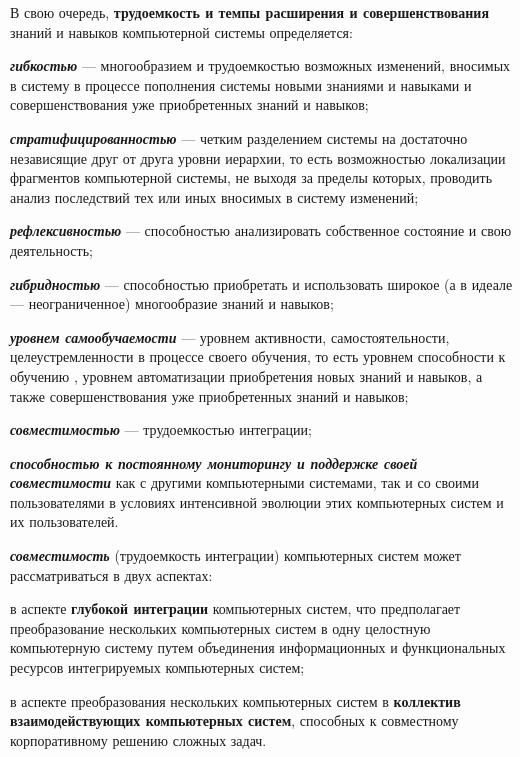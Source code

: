 В свою очередь, \textbf{трудоемкость и темпы расширения и совершенствования} знаний и навыков компьютерной системы определяется:
\begin{textitemize}
	\item \textbf{\textit{гибкостью}} --- многообразием и трудоемкостью возможных изменений, вносимых в систему в процессе пополнения системы новыми знаниями и навыками и совершенствования уже приобретенных знаний и навыков;
	\item \textbf{\textit{стратифицированностью}} --- четким разделением системы на достаточно независящие друг от друга уровни иерархии, то есть возможностью локализации фрагментов компьютерной системы, не выходя за пределы которых,  проводить анализ последствий тех или иных вносимых в систему изменений;
	\item \textbf{\textit{рефлексивностью}} --- способностью анализировать собственное состояние и свою деятельность;
	\item \textbf{\textit{гибридностью}} --- способностью приобретать и использовать широкое (а в идеале --- неограниченное) многообразие знаний и навыков;
	\item \textbf{\textit{уровнем самообучаемости}} --- уровнем активности, самостоятельности, целеустремленности в процессе своего обучения, то есть уровнем способности к обучению , уровнем автоматизации приобретения новых знаний и навыков, а также совершенствования уже приобретенных знаний и навыков;
	\item \textbf{\textit{совместимостью}} --- трудоемкостью интеграции;
	\item \textbf{\textit{способностью к постоянному мониторингу и поддержке своей совместимости}} как с другими компьютерными системами, так и со своими пользователями в условиях интенсивной эволюции этих компьютерных систем и их пользователей. 
\end{textitemize}

\textbf{\textit{совместимость}} (трудоемкость интеграции) компьютерных систем может рассматриваться в двух аспектах:
\begin{textitemize}
	\item в аспекте \textbf{глубокой интеграции} компьютерных систем, что предполагает преобразование нескольких компьютерных систем в одну целостную компьютерную систему путем объединения информационных и функциональных ресурсов интегрируемых компьютерных систем;
	\item в аспекте преобразования нескольких компьютерных систем в \textbf{коллектив взаимодействующих компьютерных систем}, способных к совместному корпоративному решению сложных задач.
\end{textitemize}


